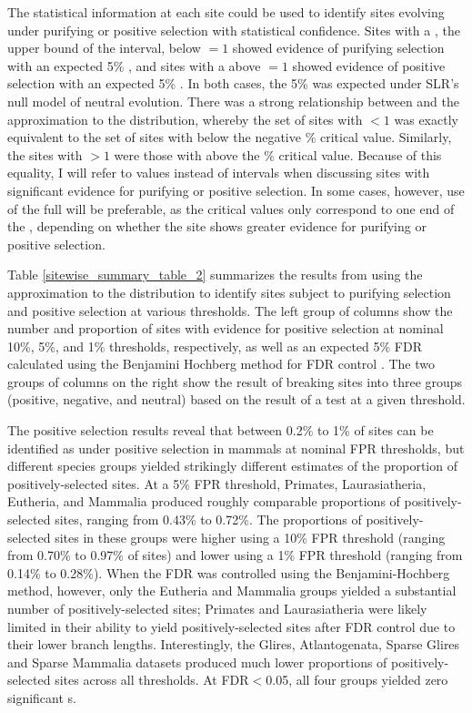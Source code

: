 The statistical information at each site could be used to identify
sites evolving under purifying or positive selection with statistical
confidence. Sites with a \ciup, the upper bound of the \ci interval,
below \omg$=1$ showed evidence of purifying selection with an expected
5\% \fpr, and sites with a \cidown above \omg$=1$ showed evidence of
positive selection with an expected 5\% \fpr. In both cases, the 5\%
\fpr was expected under SLR's null model of neutral evolution. There
was a strong relationship between \ciup and the \chisq approximation
to the \slrt distribution, whereby the set of sites with \ciup$<1$ was
exactly equivalent to the set of sites with \slrt below the negative
\% critical value. Similarly, the sites with \cidown$>1$ were
those with \slrt above the \% critical value. Because of this
equality, I will refer to \slrt values instead of \ci intervals when
discussing sites with significant evidence for purifying or positive
selection. In some cases, however, use of the full \ci will be
preferable, as the \slrt critical values only correspond to one end of
the \ci, depending on whether the site shows greater evidence for
purifying or positive selection.

Table \ref{sitewise_summary_table_2} summarizes the results from using
the \chisq approximation to the \slrt distribution to identify sites
subject to purifying selection and positive selection at various \fpr
thresholds. The left group of columns show the number and proportion
of sites with evidence for positive selection at nominal 10\%, 5\%,
and 1\% \fpr thresholds, respectively, as well as an expected 5\% FDR
calculated using the Benjamini Hochberg method for FDR control
\citep{Benjamini1995}. The two groups of columns on the right show
the result of breaking sites into three groups (positive, negative,
and neutral) based on the result of a \chisq test at a given \fpr
threshold.

The positive selection results reveal that between 0.2\% to 1\% of
sites can be identified as under positive selection in mammals at
nominal FPR thresholds, but different species groups yielded
strikingly different estimates of the proportion of
positively-selected sites. At a 5\% FPR threshold, Primates,
Laurasiatheria, Eutheria, and Mammalia produced roughly comparable
proportions of positively-selected sites, ranging from 0.43\% to
0.72\%. The proportions of positively-selected sites in these groups
were higher using a 10\% FPR threshold (ranging from 0.70\% to 0.97\%
of sites) and lower using a 1\% FPR threshold (ranging from 0.14\% to
0.28\%). When the FDR was controlled using the Benjamini-Hochberg
method, however, only the Eutheria and Mammalia groups yielded a
substantial number of positively-selected sites; Primates and
Laurasiatheria were likely limited in their ability to yield
positively-selected sites after FDR control due to their lower branch
lengths. Interestingly, the Glires, Atlantogenata, Sparse Glires and
Sparse Mammalia datasets produced much lower proportions of
positively-selected sites across all \fpr thresholds. At FDR$<$0.05,
all four groups yielded zero significant \psc{}s.

